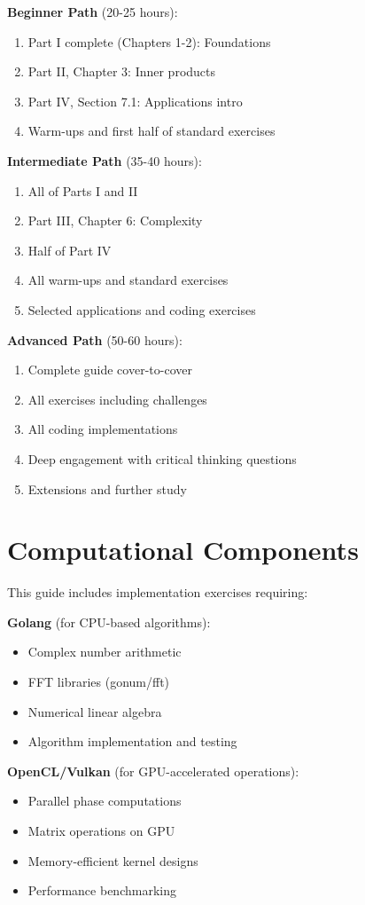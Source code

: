 \documentclass[12pt,a4paper,openany]{book}
\theoremstyle{definition}
\theoremstyle{remark}
\begin{document}
\textbf{Beginner Path} (20-25 hours):
\begin{enumerate}
\item Part I complete (Chapters 1-2): Foundations
\item Part II, Chapter 3: Inner products  
\item Part IV, Section 7.1: Applications intro
\item Warm-ups and first half of standard exercises
\end{enumerate}

\textbf{Intermediate Path} (35-40 hours):
\begin{enumerate}
\item All of Parts I and II
\item Part III, Chapter 6: Complexity
\item Half of Part IV
\item All warm-ups and standard exercises
\item Selected applications and coding exercises
\end{enumerate}

\textbf{Advanced Path} (50-60 hours):
\begin{enumerate}
\item Complete guide cover-to-cover
\item All exercises including challenges
\item All coding implementations
\item Deep engagement with critical thinking questions
\item Extensions and further study
\end{enumerate}

\section*{Computational Components}

This guide includes implementation exercises requiring:

\textbf{Golang} (for CPU-based algorithms):
\begin{itemize}
\item Complex number arithmetic
\item FFT libraries (gonum/fft)
\item Numerical linear algebra
\item Algorithm implementation and testing
\end{itemize}

\textbf{OpenCL/Vulkan} (for GPU-accelerated operations):
\begin{itemize}
\item Parallel phase computations
\item Matrix operations on GPU
\item Memory-efficient kernel designs
\item Performance benchmarking
\end{itemize}
\end{document}
